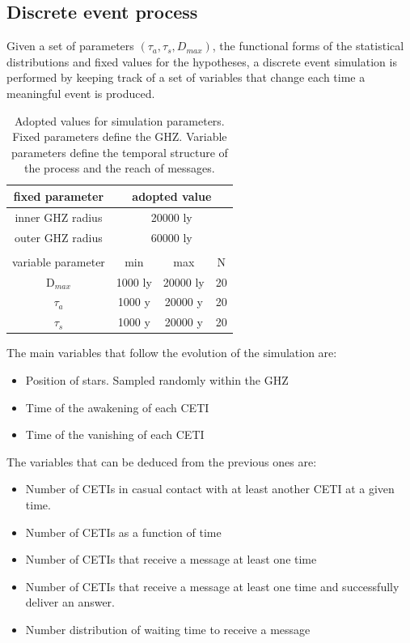 \documentclass[crop]{CSLB}%
\begin{document}
\subsection{Discrete event process}

Given a set of parameters $(\tau_a, \tau_s, D_{max})$, the functional
forms of the statistical distributions and fixed values
for the hypotheses, a discrete
event simulation is performed by keeping track of a set of variables
that change each time a meaningful event is produced.



\setlength{\tabcolsep}{10pt}
\begin{table}
\centering
\begin{tabular}{cccc}
\hline
   fixed parameter & \multicolumn{3}{c}{adopted value}\hfill \\
\hline
   inner GHZ radius\hfill & \multicolumn{3}{c}{20000 ly}\\
   outer GHZ radius & \multicolumn{3}{c}{60000 ly}\\ \\
\hline
   variable parameter & min & max & N \\
\hline
   D$_{max}$ & 1000 ly & 20000 ly & 20\\
   $\tau_{a}$ & 1000 y & 20000 y & 20\\
   $\tau_{s}$ & 1000 y & 20000 y & 20\\
\hline
\end{tabular}
\caption{Adopted values for simulation parameters. Fixed parameters
   define the GHZ.  Variable parameters define the temporal structure
   of the process and the reach of messages.}
\label{T_range_parameters}
\end{table}



The main variables that follow the evolution of the simulation are:

\begin{itemize}
   \item Position of stars.  Sampled randomly within the GHZ
   \item Time of the awakening of each CETI
   \item Time of the vanishing of each CETI
\end{itemize}

The variables that can be deduced from the previous ones are:

\begin{itemize}
   \item Number of CETIs in casual contact with at least another CETI
      at a given time.
   \item Number of CETIs as a function of time
   \item Number of CETIs that receive a message at least one time
   \item Number of CETIs that receive a message at least one time and
      successfully deliver an answer.
   \item Number distribution of waiting time to receive a message
\end{itemize}
\end{document}
